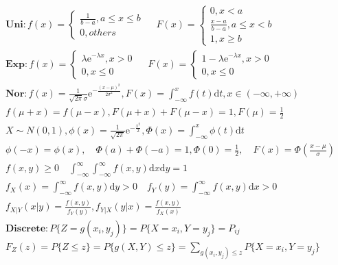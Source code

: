 \documentclass{article}
\begin{document}
\begin{align*} 
    \mathbf{Uni} : f(x) = \left\{
        \begin{array}{rl}
            \frac{1}{b-a}, a \le x \le b \\
            0, others   
        \end{array} \right.\ \quad F(x) = \left\{
        \begin{array}{rl}
            0, x < a\\ 
            \frac{x-a}{b-a}, a \le x < b \\
            1, x \ge b    
        \end{array} \right.\ \\
    \mathbf{Exp} : f(x) = \left\{
        \begin{array}{rl}
            \lambda\mathrm{e}^{-\lambda x}, x > 0 \\
            0, x \le 0    
        \end{array} \right.\ \quad F(x) = \left\{
        \begin{array}{rl}
            1-\lambda\mathrm{e}^{-\lambda x}, x > 0\\ 
            0, x \le 0 
        \end{array} \right.\ \\
    \mathbf{Nor}: f(x) = \frac{1}{\sqrt{2\pi}\sigma}\mathrm{e}^{-\frac{(x-\mu)^2}{2\sigma^2}} , F(x) = \int_{-\infty}^{x} f(t)\mathrm{d}t,x \in (-\infty,+\infty)  \\ 
    f(\mu+x) = f(\mu-x),F(\mu+x)+F(\mu-x)=1,F(\mu)=\frac{1}{2} \\
    X \sim N(0,1),\phi(x) = \frac{1}{\sqrt{2\pi}}\mathrm{e}^{-\frac{x^2}{2}},\Phi(x) = \int_{-\infty}^{x}\phi(t)\mathrm{d}t \\ 
    \phi(-x) = \phi(x),\quad \Phi(a)+\Phi(-a) = 1,\Phi(0)=\frac{1}{2}, \quad F(x) = \Phi\left(\frac{x-\mu}{\sigma}\right)\\  
    f(x,y) \ge 0 \quad \int_{-\infty}^{\infty}\int_{-\infty}^{\infty}f(x,y)\mathrm{d}x\mathrm{d}y = 1\\ 
    f_{X}(x) = \int_{-\infty}^{\infty}f(x,y)\mathrm{d}y > 0 \quad f_{Y}(y) = \int_{-\infty}^{\infty}f(x,y)\mathrm{d}x > 0 \\ 
    f_{X|Y}(x|y) = \frac{f(x,y)}{f_{Y}(y)}, f_{Y|X}(y|x) = \frac{f(x,y)}{f_{X}(x)} \\ 
    \bm{Discrete}: P\{Z=g(x_{i},y_{j})\} = P\{X=x_{i},Y=y_{j}\} = P_{ij} \\ 
    F_{Z}(z)=P\{Z \le z\} = P\{ g(X,Y) \le z \} = \sum_{g(x_{i},y_{j})\le z} P\{X=x_{i},Y=y_{j}\} \\ 

\end{align*}
\end{document}
